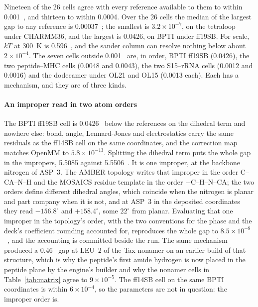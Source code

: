 Nineteen of the 26 cells agree with every reference available to them to
within 0.001~\kcal{}, and thirteen to within 0.0004. Over the 26 cells the
median of the largest gap to any reference is 0.00037~\kcal{}; the smallest is
$3.2\times10^{-7}$, on the tetraloop under CHARMM36, and the largest is
0.0426, on BPTI under ff19SB. For scale, $kT$ at 300~K is 0.596~\kcal{}, and the
sander column can resolve nothing below about $2\times10^{-4}$. The seven cells
outside 0.001~\kcal{} are, in order, BPTI ff19SB (0.0426), the two
peptide--MHC cells (0.0048 and 0.0043), the two S15--rRNA cells (0.0012 and
0.0016) and the dodecamer under OL21 and OL15 (0.0013 each). Each has a
mechanism, and they are of three kinds.

\paragraph{An improper read in two atom orders}
The BPTI ff19SB cell is 0.0426~\kcal{} below the references on the dihedral
term and nowhere else: bond, angle, Lennard-Jones and electrostatics carry the
same residuals as the ff14SB cell on the same coordinates, and the correction
map matches OpenMM to $5.8\times10^{-13}$. Splitting the dihedral term puts
the whole gap in the impropers, 5.5085 against 5.5506~\kcal{}. It is one
improper, at the backbone nitrogen of ASP~3. The AMBER topology writes that
improper in the order C--CA--N--H and the MOSAICS residue template in the order
$-$C--H--N--CA; the two orders define different dihedral angles, which coincide
when the nitrogen is planar and part company when it is not, and at ASP~3 in
the deposited coordinates they read $-156.8^{\circ}$ and $+158.4^{\circ}$,
some $22^{\circ}$ from planar. Evaluating that one improper in the topology's
order, with the two conventions for the phase and the deck's coefficient
rounding accounted for, reproduces the whole gap to $8.5\times10^{-8}$~\kcal{},
and the accounting is committed beside the run. The same mechanism produced a
0.46~\kcal{} gap at LEU~2 of the Tax nonamer on an earlier build of that
structure, which is why the peptide's first amide hydrogen is now placed in the
peptide plane by the engine's builder and why the nonamer cells in
Table~\ref{tab:matrix} agree to $9\times10^{-5}$. The ff14SB cell on the same
BPTI coordinates is within $6\times10^{-4}$, so the parameters are not in
question: the improper order is.

